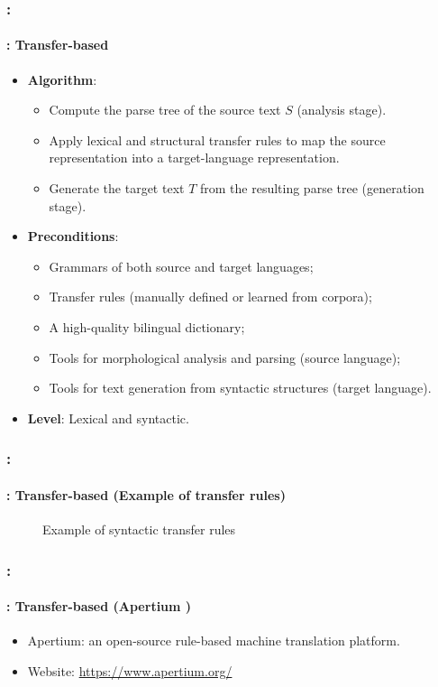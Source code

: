 \documentclass[xcolor=table]{beamer}
\begin{document}
\begin{frame}
	\frametitle{\insertshortsubtitle: \insertsection}
	\framesubtitle{\insertsubsection: Transfer-based}
	
	\begin{itemize}
		\item \textbf{Algorithm}:
		\begin{itemize}
			\item Compute the parse tree of the source text $S$ (analysis stage).
			\item Apply lexical and structural transfer rules to map the source representation into a target-language representation.
			\item Generate the target text $T$ from the resulting parse tree (generation stage).
		\end{itemize}
		\item \textbf{Preconditions}:
		\begin{itemize}
			\item Grammars of both source and target languages;
			\item Transfer rules (manually defined or learned from corpora);
			\item A high-quality bilingual dictionary;
			\item Tools for morphological analysis and parsing (source language);
			\item Tools for text generation from syntactic structures (target language).
		\end{itemize}
		\item \textbf{Level}: Lexical and syntactic.
	\end{itemize}
	
\end{frame}


\begin{frame}
	\frametitle{\insertshortsubtitle: \insertsection}
	\framesubtitle{\insertsubsection: Transfer-based (Example of transfer rules)}

	\begin{figure}
		\centering
		\caption{Example of syntactic transfer rules \cite{06-quah}}
	\end{figure}

\end{frame}

\begin{frame}
	\frametitle{\insertshortsubtitle: \insertsection}
	\framesubtitle{\insertsubsection: Transfer-based (Apertium \cite{11-forcada-al})}
	
	\begin{itemize}
		\item Apertium: an open-source rule-based machine translation platform.
		\item Website: \url{https://www.apertium.org/}
	\end{itemize}

	
\end{frame}
\end{document}
